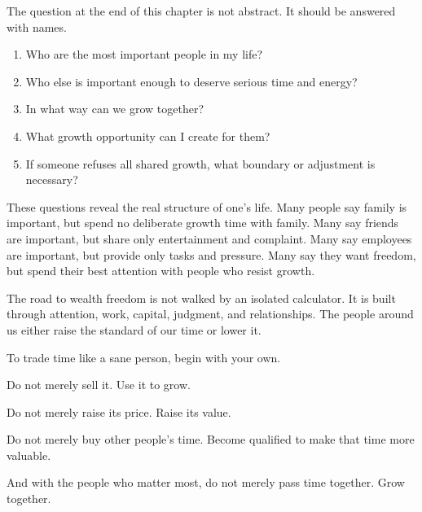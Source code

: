 The question at the end of this chapter is not abstract. It should be answered with names.

\begin{enumerate}
\item Who are the most important people in my life?
\item Who else is important enough to deserve serious time and energy?
\item In what way can we grow together?
\item What growth opportunity can I create for them?
\item If someone refuses all shared growth, what boundary or adjustment is necessary?
\end{enumerate}

These questions reveal the real structure of one's life. Many people say family is important, but spend no deliberate growth time with family. Many say friends are important, but share only entertainment and complaint. Many say employees are important, but provide only tasks and pressure. Many say they want freedom, but spend their best attention with people who resist growth.

The road to wealth freedom is not walked by an isolated calculator. It is built through attention, work, capital, judgment, and relationships. The people around us either raise the standard of our time or lower it.

To trade time like a sane person, begin with your own.

Do not merely sell it. Use it to grow.

Do not merely raise its price. Raise its value.

Do not merely buy other people's time. Become qualified to make that time more valuable.

And with the people who matter most, do not merely pass time together. Grow together.

